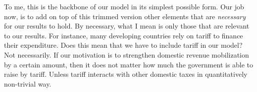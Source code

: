 \documentclass[twoside,11pt,leqno]{article}
\begin{document}
To me, this is the backbone of our model in its simplest possible form. Our job now, is to add on top of this trimmed version other elements that are \textit{necessary} for our results to hold. By necessary, what I mean is only those that are relevant to our results. For instance, many developing countries rely on tariff to finance their expenditure. Does this mean that we have to include tariff in our model? Not necessarily. If our motivation is to strengthen domestic revenue mobilization by a certain amount, then it does not matter how much the government is able to raise by tariff. Unless tariff interacts with other domestic taxes in quantitatively non-trivial way. %
\end{document}
